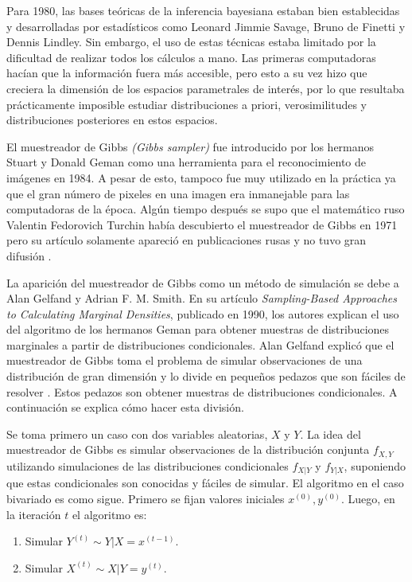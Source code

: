 \documentclass[11pt,a4paper]{article}
\begin{document}
Para 1980, las bases teóricas de la inferencia bayesiana estaban bien establecidas y desarrolladas por estadísticos como Leonard Jimmie Savage, Bruno de Finetti y Dennis Lindley. Sin embargo, el uso de estas técnicas estaba limitado por la dificultad de realizar todos los cálculos a mano. Las primeras computadoras hacían que la información fuera más accesible, pero esto a su vez hizo que creciera la dimensión de los espacios parametrales de interés, por lo que resultaba prácticamente imposible estudiar distribuciones a priori, verosimilitudes y distribuciones posteriores en estos espacios.

El muestreador de Gibbs \textit{(Gibbs sampler)} fue introducido por los hermanos Stuart y Donald Geman como una herramienta para el reconocimiento de imágenes en 1984. A pesar de esto, tampoco fue muy utilizado en la práctica ya que el gran número de pixeles en una imagen era inmanejable para las computadoras de la época. Algún tiempo después se supo que el matemático ruso Valentin Fedorovich Turchin había descubierto el muestreador de Gibbs en 1971 pero su artículo solamente apareció en publicaciones rusas y no tuvo gran difusión \citep{bertsch}.

La aparición del muestreador de Gibbs como un método de simulación se debe a Alan Gelfand y Adrian F. M. Smith. En su artículo \textit{Sampling-Based Approaches to Calculating Marginal Densities}, publicado en 1990, los autores explican el uso del algoritmo de los hermanos Geman para obtener muestras de distribuciones marginales a partir de distribuciones condicionales. Alan Gelfand explicó que el muestreador de Gibbs toma el problema de simular observaciones de una distribución de gran dimensión y lo divide en pequeños pedazos que son fáciles de resolver \citep{bertsch}. Estos pedazos son obtener muestras de distribuciones condicionales. A continuación se explica cómo hacer esta división.

Se toma primero un caso con dos variables aleatorias, $X$ y $Y$. La idea del muestreador de Gibbs es simular observaciones de la distribución conjunta $f_{X, Y}$ utilizando simulaciones de las distribuciones condicionales $f_{X|Y}$ y $f_{Y|X}$, suponiendo que estas condicionales son conocidas y fáciles de simular. El algoritmo en el caso bivariado es como sigue. Primero se fijan valores iniciales $x^{(0)}, y^{(0)}$. Luego, en la iteración $t$ el algoritmo es:
\begin{enumerate}
\item Simular $Y^{(t)} \sim Y|X = x^{(t-1)}$.
\item Simular $X^{(t)} \sim X|Y = y^{(t)}$.
\end{enumerate}
\end{document}
